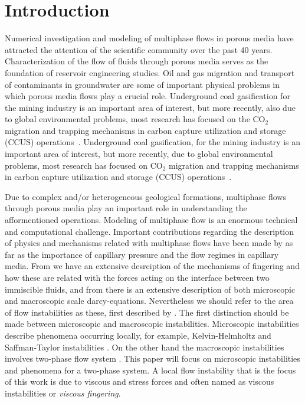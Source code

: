\documentclass[preprint,authoryear,12pt]{elsarticle}
\begin{document}
\section{Introduction}\label{section:intro}
\medskip
Numerical investigation and modeling of multiphase flows in porous media have attracted the attention of the scientific community over the past 40 years. Characterization of the flow of fluids through porous media serves as the foundation of reservoir engineering studies. Oil and gas migration and transport of contaminants in groundwater are some of important physical problems in which porous media flows play a crucial role. 
Underground coal gasification for the mining industry is an important area of interest, but more recently, also due to global environmental problems, most research has focused on the CO$_{\text{2}}$ migration and trapping mechanisms in carbon capture utilization and storage (CCUS) operations~\citep{spycher_2003, chen_2006, self_2012, pruess_1990c, white_1981,jiang_2011}.
Underground coal gasification, for the mining industry is an important area of interest, but more recently, due to global environmental problems, most research has focused on CO$_{\text{2}}$ migration and trapping mechanisms in carbon capture utilization and storage (CCUS) operations~\citep{spycher_2003, chen_2006, self_2012, pruess_1990c, white_1981,jiang_2011}.

\medskip
Due to complex and/or heterogeneous geological formations, multiphase flows through porous media play an important role in understanding the afformentioned operations. Modeling of multiphase flow is an enormous technical and computational challenge. Important contributions regarding the description of physics and mechanisms related with multiphase flows have been made by \citet{wooding_1976} as far as the importance of capillary pressure and the flow regimes in capillary media. From \citet{homsy_1987} we have an extensive desrciption of the mechanisms of fingering and how these are related with the forces acting on the interface between two immiscible fluids, and from \citet{adler_1988} there is an extensive description of both microscopic and macroscopic scale darcy-equations. Nevertheless we should refer to the area of flow instabilities  as these, first described by \citet{saffman_1958}. The first distinction should be made between microscopic and macroscopic instabilities. Microscopic instabilities describe phenomena occurring locally, for example, Kelvin-Helmholtz and Saffman-Taylor instabilities \citep{saffman_1959}. On the other hand the macroscopic instabilities involves two-phase flow system \citep{bottoni_1992}. This paper will focus on microscopic instabilities and phenomena for a two-phase system. A local flow instability that is the focus of this work is due to viscous and stress forces and often named as viscous instabilities or \textit{viscous fingering}. 
\end{document}
